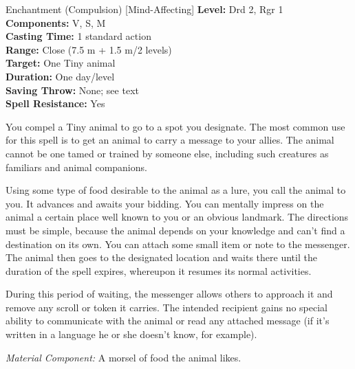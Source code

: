 {Enchantment (Compulsion) [Mind-Affecting]}
{
	\textbf{Level:}
	Drd 2, Rgr 1\\
	\textbf{Components:}
	V, S, M\\
	\textbf{Casting Time:}
	1 standard action\\
	\textbf{Range:}
	Close (7.5 m + 1.5 m/2 levels)\\
	\textbf{Target:}
	One Tiny animal\\
	\textbf{Duration:}
	One day/level\\
	\textbf{Saving Throw:}
	None; see text\\
	\textbf{Spell Resistance:}
	Yes\\
}
{
	You compel a Tiny animal to go to a spot you designate. The most common use for this spell is to get an animal to carry a message to your allies. The animal cannot be one tamed or trained by someone else, including such creatures as familiars and animal companions.

	Using some type of food desirable to the animal as a lure, you call the animal to you. It advances and awaits your bidding. You can mentally impress on the animal a certain place well known to you or an obvious landmark. The directions must be simple, because the animal depends on your knowledge and can't find a destination on its own. You can attach some small item or note to the messenger. The animal then goes to the designated location and waits there until the duration of the spell expires, whereupon it resumes its normal activities.

	During this period of waiting, the messenger allows others to approach it and remove any scroll or token it carries. The intended recipient gains no special ability to communicate with the animal or read any attached message (if it's written in a language he or she doesn't know, for example).

	\textit{Material Component:}
	A morsel of food the animal likes.

}
